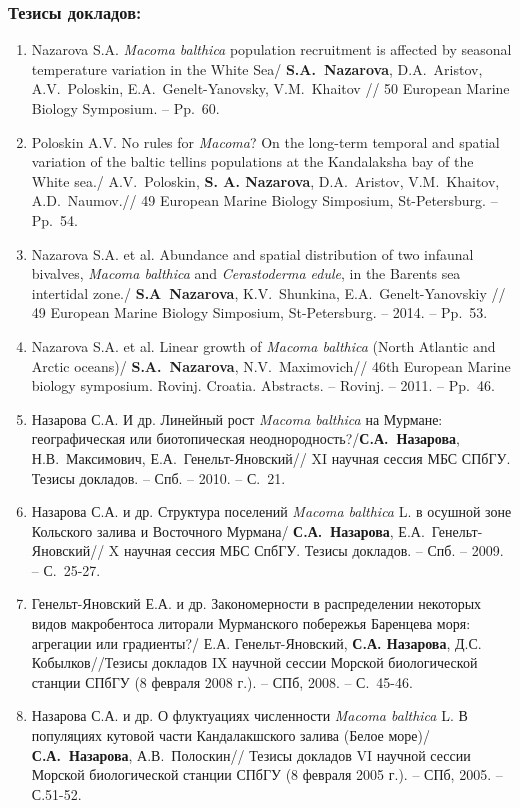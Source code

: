 {\begin{small}
\subsubsection*{Тезисы докладов:}
\begin{enumerate}
\item Nazarova S.A. \textit{Macoma balthica} population recruitment is affected by seasonal temperature variation in the White Sea/ \textbf{S.A.~Nazarova}, D.A.~Aristov, A.V.~Poloskin, E.A.~Genelt-Yanovsky, V.M.~Khaitov // 50 European Marine Biology Symposium. -- Pp.~60.
\item Poloskin A.V. No rules for \textit{Macoma}?  On the long-term temporal and spatial variation of the baltic tellins populations at the Kandalaksha bay of the White sea./ A.V.~Poloskin, \textbf{S. A. Nazarova}, D.A.~Aristov, V.M.~Khaitov, A.D.~Naumov.// 49 European Marine Biology Simposium, St-Petersburg. -- Pp.~54.
\item Nazarova S.A. et al. Abundance and spatial distribution of two infaunal bivalves, \textit{Macoma balthica} and \textit{Cerastoderma edule}, in the Barents sea intertidal zone./ \textbf{S.A~Nazarova}, K.V.~Shunkina, E.A.~Genelt-Yanovskiy // 49 European Marine Biology Simposium, St-Petersburg. -- 2014. -- Pp.~53.
\item Nazarova S.A. et al. Linear growth of \textit{Macoma balthica} (North Atlantic and Arctic oceans)/ \textbf{S.A.~Nazarova}, N.V.~Maximovich// 46th European Marine biology symposium. Rovinj. Croatia. Abstracts. -- Rovinj. -- 2011. -- Pp.~46.
\item Назарова С.А. И др. Линейный рост \textit{Macoma balthica} на Мурмане: географическая или биотопическая неоднородность?/\textbf{С.А.~Назарова},  Н.В.~Максимович, Е.А.~Генельт-Яновский// XI научная сессия МБС СПбГУ. Тезисы докладов. -- Спб. -- 2010. -- С.~21. 
\item Назарова С.А. и др. Структура поселений \textit{Macoma balthica} L. в осушной зоне Кольского залива и Восточного Мурмана/ \textbf{С.А.~Назарова}, Е.А.~Генельт-Яновский// X научная сессия МБС СпбГУ. Тезисы докладов. -- Спб. -- 2009. -- С.~25-27.
\item Генельт-Яновский Е.А. и др. Закономерности в распределении некоторых видов макробентоса литорали Мурманского побережья Баренцева моря: агрегации или градиенты?/ Е.А. Генельт-Яновский, \textbf{С.А. Назарова}, Д.С. Кобылков//Тезисы докладов IX научной сессии Морской биологической станции СПбГУ (8 февраля 2008 г.). -- СПб, 2008. -- С.~45-46.
\item Назарова С.А.  и др. О флуктуациях численности \textit{Macoma balthica} L. В популяциях кутовой части Кандалакшского залива (Белое море)/ \textbf{С.А.~Назарова}, А.В.~Полоскин// Тезисы докладов VI научной сессии Морской биологической станции СПбГУ (8 февраля 2005 г.). -- СПб, 2005. -- С.51-52.

\end{enumerate}
\end{small}}
